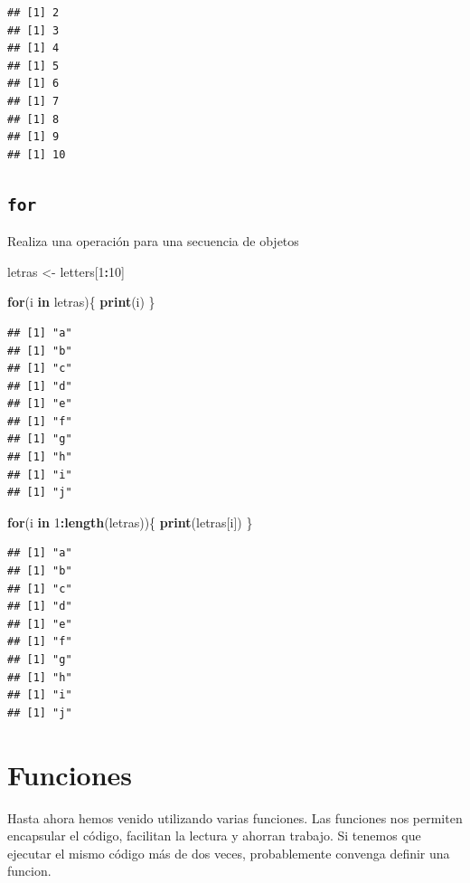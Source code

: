 \documentclass[spanish,]{book}
\newenvironment{Shaded}{\begin{snugshade}}{\end{snugshade}}
\newcommand{\KeywordTok}[1]{\textcolor[rgb]{0.13,0.29,0.53}{\textbf{#1}}}
\newcommand{\DecValTok}[1]{\textcolor[rgb]{0.00,0.00,0.81}{#1}}
\newcommand{\StringTok}[1]{\textcolor[rgb]{0.31,0.60,0.02}{#1}}
\newcommand{\ControlFlowTok}[1]{\textcolor[rgb]{0.13,0.29,0.53}{\textbf{#1}}}
\newcommand{\OperatorTok}[1]{\textcolor[rgb]{0.81,0.36,0.00}{\textbf{#1}}}
\newcommand{\NormalTok}[1]{#1}
\begin{document}
\begin{verbatim}
## [1] 2
## [1] 3
## [1] 4
## [1] 5
## [1] 6
## [1] 7
## [1] 8
## [1] 9
## [1] 10
\end{verbatim}

\section{\texorpdfstring{\texttt{for}}{for}}\label{for}

Realiza una operación para una secuencia de objetos

\begin{Shaded}
\begin{Highlighting}[]
\NormalTok{letras <-}\StringTok{ }\NormalTok{letters[}\DecValTok{1}\OperatorTok{:}\DecValTok{10}\NormalTok{]}

\ControlFlowTok{for}\NormalTok{(i }\ControlFlowTok{in}\NormalTok{ letras)\{}
  \KeywordTok{print}\NormalTok{(i)}
\NormalTok{\}}
\end{Highlighting}
\end{Shaded}

\begin{verbatim}
## [1] "a"
## [1] "b"
## [1] "c"
## [1] "d"
## [1] "e"
## [1] "f"
## [1] "g"
## [1] "h"
## [1] "i"
## [1] "j"
\end{verbatim}

\begin{Shaded}
\begin{Highlighting}[]
\ControlFlowTok{for}\NormalTok{(i }\ControlFlowTok{in} \DecValTok{1}\OperatorTok{:}\KeywordTok{length}\NormalTok{(letras))\{}
  \KeywordTok{print}\NormalTok{(letras[i])}
\NormalTok{\}}
\end{Highlighting}
\end{Shaded}

\begin{verbatim}
## [1] "a"
## [1] "b"
## [1] "c"
## [1] "d"
## [1] "e"
## [1] "f"
## [1] "g"
## [1] "h"
## [1] "i"
## [1] "j"
\end{verbatim}

\chapter{Funciones}\label{funciones}

Hasta ahora hemos venido utilizando varias funciones. Las funciones nos
permiten encapsular el código, facilitan la lectura y ahorran trabajo.
Si tenemos que ejecutar el mismo código más de dos veces, probablemente
convenga definir una funcion.
\end{document}
